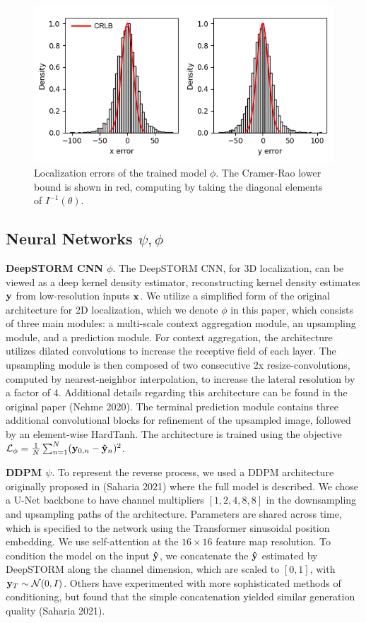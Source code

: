 \documentclass{article}
\begin{document}
\begin{figure}
\centering
\includegraphics[scale=0.7]{Errors.png}
\caption{Localization errors of the trained model $\phi$. The Cramer-Rao lower bound is shown in red, computing by taking the diagonal elements of $I^{-1}(\theta)$.}
\end{figure}


\subsection{Neural Networks $\psi,\phi$}

\textbf{DeepSTORM CNN $\phi$}. The DeepSTORM CNN, for 3D localization, can be viewed as a deep kernel density estimator, reconstructing kernel density estimates $\bold{y}$ from low-resolution inputs $\bold{x}$. We utilize a simplified form of the original architecture for 2D localization, which we denote $\phi$ in this paper, which consists of three main modules: a multi-scale context aggregation module, an upsampling module, and a prediction module. For context aggregation, the architecture utilizes dilated convolutions to increase the receptive field of each layer. The upsampling module is then composed of two consecutive 2x resize-convolutions, computed by nearest-neighbor interpolation, to increase the lateral resolution by a factor of 4. Additional details regarding this architecture can be found in the original paper (Nehme 2020). The terminal prediction module contains three additional convolutional blocks for refinement of the upsampled image, followed by an element-wise HardTanh. The architecture is trained using the objective $\mathcal{L}_{\phi} = \frac{1}{N}\sum_{n=1}^{N} (\bold{y}_{0,n}-\bold{\hat{y}}_{n})^{2}$. 

\textbf{DDPM $\psi$}. To represent the reverse process, we used a DDPM architecture originally proposed in (Saharia 2021) where the full model is described. We chose a U-Net backbone to have channel multipliers $[1,2,4,8,8]$ in the downsampling and upsampling paths of the architecture. Parameters are shared across time, which is specified to the network using the Transformer sinusoidal position embedding. We use self-attention at the $16 \times 16$ feature map resolution. To condition the model on the input $\bold{\hat{y}}$, we concatenate the $\bold{\hat{y}}$ estimated by DeepSTORM along the channel dimension, which are scaled to $[0,1]$, with $\bold{y}_T\sim \mathcal{N}(0, I)$. Others have experimented with more sophisticated methods of conditioning, but found that the simple concatenation yielded similar generation quality (Saharia 2021). 
\end{document}
